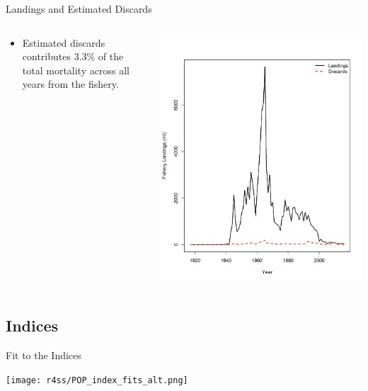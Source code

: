 \documentclass[pdf]{beamer}\usepackage[]{graphicx}\usepackage[]{color}
\begin{document}
\begin{frame}{Landings and Estimated Discards}
\begin{columns}
  \begin{column}{0.4\textwidth}
    \begin{itemize}
      \item Estimated discards contributes 3.3\% of the total mortality across all years from the fishery.
    \end{itemize}
  \end{column}
  
  \begin{column}{0.6\textwidth}
  \begin{center}
    \includegraphics[scale = 0.33]{figures/POP_Landings_Discards.png}
  \end{center}
  \end{column}
\end{columns}
\end{frame}

\subsection{Indices}
\begin{frame}{Fit to the Indices}
  \begin{center}
    \texttt{[image: r4ss/POP\_index\_fits\_alt.png]}
  \end{center}
\end{frame}
\end{document}
